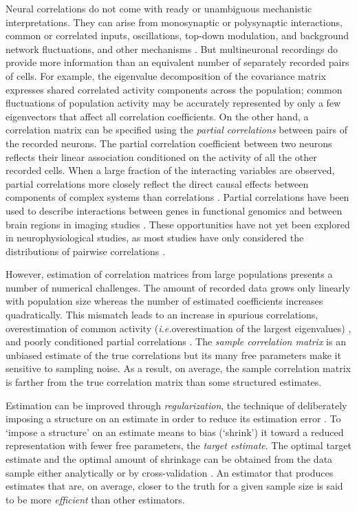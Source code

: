 \documentclass[10pt]{article}
\newcommand{\sq}[1]{\lq#1\rq}
\newcommand{\ie}{\emph{i.e.}\;}
\begin{document}
Neural correlations do not come with ready or unambiguous mechanistic interpretations. They can arise from monosynaptic or polysynaptic interactions, common or correlated inputs, oscillations, top-down modulation, and background network fluctuations, and other mechanisms \cite{Perkel:1967, Moore:1970, Shadlen:1998, Salinas:2001, Ostojic:2009, Rosenbaum:2011}. But multineuronal recordings do provide more information than an equivalent number of separately recorded pairs of cells. For example, the eigenvalue decomposition of the covariance matrix expresses shared correlated activity components across the population; common fluctuations of population activity may be accurately represented by only a few eigenvectors that affect all correlation coefficients. On the other hand, a correlation matrix can be specified using the \emph{partial correlations} between pairs of the recorded neurons. The partial correlation coefficient between two neurons reflects their linear association conditioned on the activity of all the other recorded cells.  When a large fraction of the interacting variables are observed, partial correlations more closely reflect the direct causal effects between components of complex systems than correlations \cite{Whittaker:2009}. Partial correlations have been used to describe interactions between genes in functional genomics \cite{Schafer:2005, Peng:2009} and between brain regions in imaging studies \cite{Varoquaux:2012, Ryali:2012}. These opportunities have not yet been explored in neurophysiological studies, as most studies have only considered the distributions of pairwise correlations \cite{Zohary:1994, Bair:2001, Smith:2008, Ecker:2010}. 

However, estimation of correlation matrices from large populations presents a number of numerical challenges. The amount of recorded data grows only linearly with population size whereas the number of estimated coefficients increases quadratically. This mismatch leads to an increase in spurious correlations, overestimation of common activity (\ie overestimation of the largest eigenvalues) \cite{Ledoit:2004}, and poorly conditioned partial correlations \cite{Schafer:2005}. The \emph{sample correlation matrix} is an unbiased estimate of the true correlations but its many free parameters make it sensitive to sampling noise. As a result, on average, the sample correlation matrix is farther from the true correlation matrix than some structured estimates. 

Estimation can be improved through \emph{regularization},  the technique of deliberately imposing a structure on an estimate in order to reduce its estimation error \cite{Schafer:2005, Bickel:2006}. To \sq{impose a structure} on an estimate means to bias (\sq{shrink}) it toward a reduced representation  with fewer free parameters, the \emph{target estimate}.   The optimal target estimate and the optimal amount of shrinkage can be obtained from the data sample either analytically \cite{Ledoit:2003, Ledoit:2004, Schafer:2005}  or by cross-validation \cite{Friedman:1989}. An estimator that produces estimates that are, on average, closer to the truth for a given sample size is said to be more \emph{efficient} than other estimators.
\end{document}
